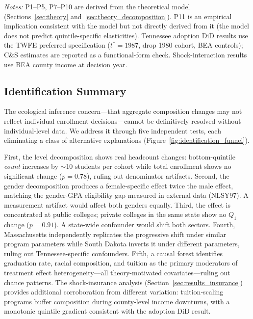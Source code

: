 \begin{table}[H]
\begin{threeparttable}
\begin{tablenotes}[flushleft]
\footnotesize
\item \textit{Notes:} P1--P5, P7--P10 are derived from the theoretical
  model (Sections~\ref{sec:theory} and~\ref{sec:theory_decomposition}).
  P11 is an empirical implication consistent with the model but
  not directly derived from it (the model does not predict
  quintile-specific elasticities).
  Tennessee adoption DiD results use the TWFE preferred specification
  ($t^* = 1987$, drop 1980 cohort, BEA controls); C\&S estimates are
  reported as a functional-form check. Shock-interaction results use
  BEA county income at decision year.
\end{tablenotes}
\end{threeparttable}
\end{table}

\subsection{Identification Summary}

The ecological inference concern---that aggregate composition changes
may not reflect individual enrollment decisions---cannot be
definitively resolved without individual-level data. We address it
through five independent tests, each eliminating a class of
alternative explanations (Figure~\ref{fig:identification_funnel}).

First, the level decomposition shows real headcount changes:
bottom-quintile \emph{count} increases by $\sim$10 students per
cohort while total enrollment shows no significant change
($p = 0.78$), ruling out denominator artifacts. Second, the gender
decomposition produces a female-specific effect twice the male
effect, matching the gender-GPA eligibility gap measured in external
data (NLSY97). A measurement artifact would affect both genders
equally. Third, the effect is concentrated at public colleges;
private colleges in the same state show no $Q_1$ change
($p = 0.91$). A state-wide confounder would shift both sectors.
Fourth, Massachusetts independently replicates the progressive shift
under similar program parameters while South Dakota inverts it under
different parameters, ruling out Tennessee-specific confounders.
Fifth, a causal forest identifies graduation rate, racial
composition, and tuition as the primary moderators of treatment
effect heterogeneity---all theory-motivated covariates---ruling out
chance patterns. The shock-insurance analysis
(Section~\ref{sec:results_insurance}) provides additional
corroboration from different variation: tuition-scaling programs
buffer composition during county-level income downturns, with a
monotonic quintile gradient consistent with the adoption DiD result.

